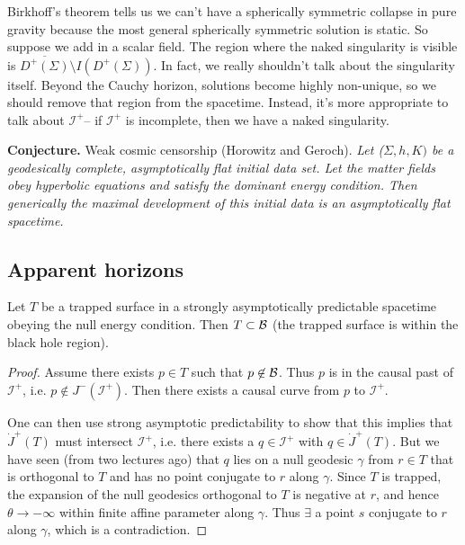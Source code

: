 Birkhoff's theorem tells us we can't have a spherically symmetric collapse in pure gravity because the most general spherically symmetric solution is static. So suppose we add in a scalar field. The region where the naked singularity is visible is $\overline{D^+(\Sigma)}\setminus I(D^+(\Sigma))$.
In fact, we really shouldn't talk about the singularity itself. Beyond the Cauchy horizon, solutions become highly non-unique, so we should remove that region from the spacetime. Instead, it's more appropriate to talk about $\mathcal{I}^+$-- if $\mathcal{I}^+$ is incomplete, then we have a naked singularity.

\textbf{Conjecture.} Weak cosmic censorship (Horowitz and Geroch). \textit{Let ($\Sigma, h, K)$ be a geodesically complete, asymptotically flat initial data set. Let the matter fields obey hyperbolic equations and satisfy the dominant energy condition. Then generically the maximal development of this initial data is an asymptotically flat spacetime.}

\subsection*{Apparent horizons}
\begin{thm}
    Let $T$ be a trapped surface in a strongly asymptotically predictable spacetime obeying the null energy condition. Then $T\subset \mathcal{B}$ (the trapped surface is within the black hole region).
\end{thm}
\begin{proof}
    Assume there exists $p\in T$ such that $p\not \in \mathcal{B}$. Thus $p$ is in the causal past of $\mathcal{I}^+$, i.e. $p\notin J^-(\mathcal{I}^+).$ Then there exists a causal curve from $p$ to $\mathcal{I}^+$.
    
    One can then use strong asymptotic predictability to show that this implies that $\dot J^+(T)$ must intersect $\mathcal{I}^+$, i.e. there exists a $q\in \mathcal{I}^+$ with $q\in \dot J^+(T)$. But we have seen (from two lectures ago) that $q$ lies on a null geodesic $\gamma$ from $r\in T$ that is orthogonal to $T$ and has no point conjugate to $r$ along $\gamma$. Since $T$ is trapped, the expansion of the null geodesics orthogonal to $T$ is negative at $r$, and hence $\theta\to -\infty$ within finite affine parameter along $\gamma$. Thus $\exists$ a point $s$ conjugate to $r$ along $\gamma$, which is a contradiction.
\end{proof}

